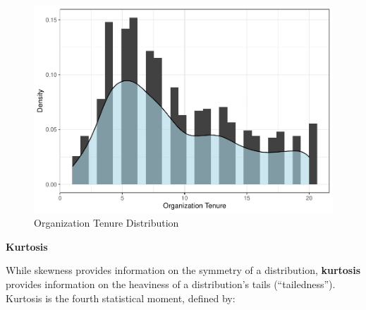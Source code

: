 \documentclass[]{book}
\newenvironment{Shaded}{\begin{snugshade}}{\end{snugshade}}
\newcommand{\CommentTok}[1]{\textcolor[rgb]{0.56,0.35,0.01}{\textit{#1}}}
\newcommand{\DataTypeTok}[1]{\textcolor[rgb]{0.13,0.29,0.53}{#1}}
\newcommand{\FloatTok}[1]{\textcolor[rgb]{0.00,0.00,0.81}{#1}}
\newcommand{\KeywordTok}[1]{\textcolor[rgb]{0.13,0.29,0.53}{\textbf{#1}}}
\newcommand{\NormalTok}[1]{#1}
\newcommand{\OperatorTok}[1]{\textcolor[rgb]{0.81,0.36,0.00}{\textbf{#1}}}
\newcommand{\StringTok}[1]{\textcolor[rgb]{0.31,0.60,0.02}{#1}}
\begin{document}
\begin{Shaded}
\end{Shaded}

\begin{figure}

{\centering \includegraphics{_main_files/figure-latex/org-tenure-distribution-1} 

}

\caption{Organization Tenure Distribution}\label{fig:org-tenure-distribution}
\end{figure}

\textbf{Kurtosis}

While skewness provides information on the symmetry of a distribution, \textbf{kurtosis} provides information on the heaviness of a distribution's tails (``tailedness''). Kurtosis is the fourth statistical moment, defined by:
\end{document}
